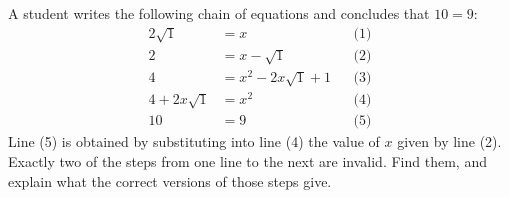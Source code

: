 A student writes the following chain of equations and concludes that $10=9$:
\begin{align*}
2\sqrt1&=x &&\text{(1)}\\
2&=x-\sqrt1 &&\text{(2)}\\
4&=x^2-2x\sqrt1+1 &&\text{(3)}\\
4+2x\sqrt1&=x^2 &&\text{(4)}\\
10&=9 &&\text{(5)}
\end{align*}
Line (5) is obtained by substituting into line (4) the value of $x$ given by line (2). Exactly two of the steps from one line to the next are invalid. Find them, and explain what the correct versions of those steps give.
